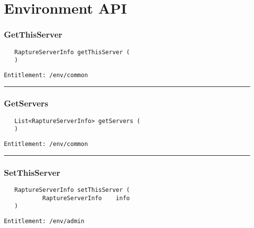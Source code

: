 \chapter{Environment API}

\subsection{GetThisServer}
\label{Api:GetThisServer}
\begin{Verbatim}
   RaptureServerInfo getThisServer (
   )
\end{Verbatim}
\begin{Verbatim}[formatcom=\color{Maroon}]
  Entitlement: /env/common
\end{Verbatim}



\rule{12cm}{2pt}
\subsection{GetServers}
\label{Api:GetServers}
\begin{Verbatim}
   List<RaptureServerInfo> getServers (
   )
\end{Verbatim}
\begin{Verbatim}[formatcom=\color{Maroon}]
  Entitlement: /env/common
\end{Verbatim}



\rule{12cm}{2pt}
\subsection{SetThisServer}
\label{Api:SetThisServer}
\begin{Verbatim}
   RaptureServerInfo setThisServer (
           RaptureServerInfo    info
   )
\end{Verbatim}
\begin{Verbatim}[formatcom=\color{Maroon}]
  Entitlement: /env/admin
\end{Verbatim}



